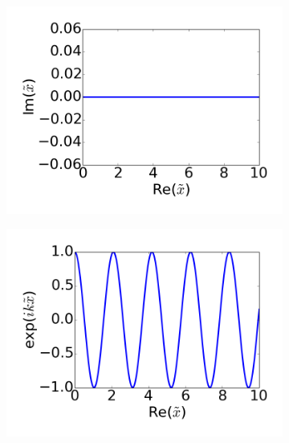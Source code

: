 \begin{figure}[htb]
	\begin{subfigure}{0.45\textwidth}
		\includegraphics[width=\textwidth]{images/pml/real-x.png}
		\caption{}
	\end{subfigure}
	\begin{subfigure}{0.45\textwidth}
		\includegraphics[width=\textwidth]{images/pml/real-x-wave.png}
		\caption{}
	\end{subfigure}



\end{figure}
